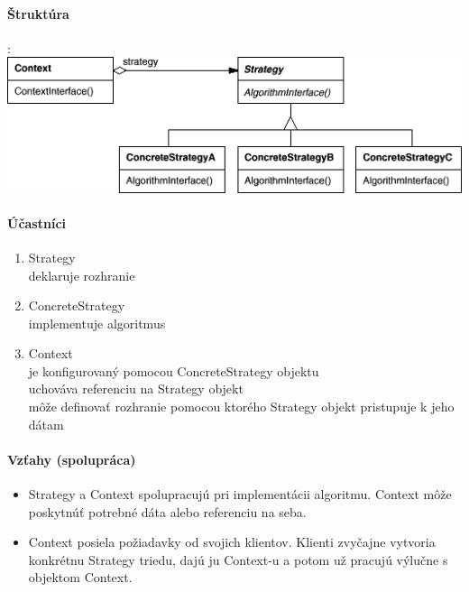		\paragraph{Štruktúra}:\\

			\includegraphics[width=.9\textwidth]{images/programovanie/strategy2}

		\paragraph{Účastníci}
			\begin{enumerate}
				\item Strategy\\
				deklaruje rozhranie
				\item ConcreteStrategy\\
				implementuje algoritmus
				\item Context\\
				je konfigurovaný pomocou ConcreteStrategy objektu\\
				uchováva referenciu na Strategy objekt\\
				môže definovať rozhranie pomocou ktorého Strategy objekt pristupuje k jeho dátam
			\end{enumerate}
		\paragraph{Vzťahy (spolupráca)}
			\begin{itemize}
			\item Strategy a Context spolupracujú pri implementácii algoritmu. Context môže poskytnúť potrebné dáta alebo referenciu na seba.
			\item Context posiela požiadavky od svojich klientov. Klienti zvyčajne vytvoria konkrétnu Strategy triedu, dajú ju Context-u a potom už pracujú výlučne s objektom Context.
			\end{itemize}

